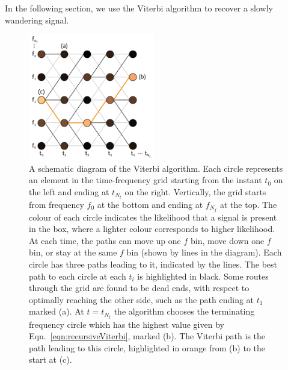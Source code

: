 \documentclass[paper-main.tex]{subfiles}
\begin{document}
In the following section, we use the Viterbi algorithm to recover a slowly wandering signal.



\begin{figure}
\includegraphics[width=0.49\textwidth]{figures/viterbiDiagram.pdf}
\caption{\label{fig:viterbi}
A schematic diagram of the Viterbi algorithm. 
Each circle represents an element in the time-frequency grid starting from the instant $t_0$ on the left and ending at $t_{N_t}$ on the right. 
Vertically, the grid starts from frequency $f_0$ at the bottom and ending at $f_{N_f}$ at the top. 
The colour of each circle indicates the likelihood that a signal is present in the box, where a lighter colour corresponds to higher likelihood. 
At each time, the paths can move up one $f$ bin, move down one $f$ bin, or stay at the same $f$ bin (shown by lines in the diagram). 
Each circle has three paths leading to it, indicated by the lines. 
The best path to each circle at each $t_i$ is highlighted in black. 
Some routes through the grid are found to be dead ends, with respect to optimally reaching the other side, such as the path ending at $t_1$ marked (a). 
At $t=t_{N_t}$ the algorithm chooses the terminating frequency circle which has the highest value given by Eqn.~\ref{eqn:recursiveViterbi}, marked (b). 
The Viterbi path is the path leading to this circle, highlighted in orange from (b) to the start at (c). 
}
\end{figure}
\end{document}
